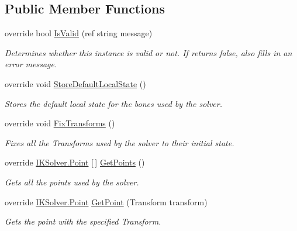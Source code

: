 \subsection*{Public Member Functions}
\begin{DoxyCompactItemize}
\item 
override bool \mbox{\hyperlink{class_root_motion_1_1_final_i_k_1_1_i_k_solver_f_a_b_r_i_k_root_aadae32713090c6aa827af13781f4a3da}{Is\+Valid}} (ref string message)
\begin{DoxyCompactList}\small\item\em Determines whether this instance is valid or not. If returns false, also fills in an error message. \end{DoxyCompactList}\item 
override void \mbox{\hyperlink{class_root_motion_1_1_final_i_k_1_1_i_k_solver_f_a_b_r_i_k_root_a6c378e881e1e7dcb7a2ce54ce39e0e88}{Store\+Default\+Local\+State}} ()
\begin{DoxyCompactList}\small\item\em Stores the default local state for the bones used by the solver. \end{DoxyCompactList}\item 
override void \mbox{\hyperlink{class_root_motion_1_1_final_i_k_1_1_i_k_solver_f_a_b_r_i_k_root_a174767501bc62dd1fb760e35a01a6ab0}{Fix\+Transforms}} ()
\begin{DoxyCompactList}\small\item\em Fixes all the Transforms used by the solver to their initial state. \end{DoxyCompactList}\item 
override \mbox{\hyperlink{class_root_motion_1_1_final_i_k_1_1_i_k_solver_1_1_point}{I\+K\+Solver.\+Point}} \mbox{[}$\,$\mbox{]} \mbox{\hyperlink{class_root_motion_1_1_final_i_k_1_1_i_k_solver_f_a_b_r_i_k_root_a386a3cb55b688ec13b8bb2299c0f2e75}{Get\+Points}} ()
\begin{DoxyCompactList}\small\item\em Gets all the points used by the solver. \end{DoxyCompactList}\item 
override \mbox{\hyperlink{class_root_motion_1_1_final_i_k_1_1_i_k_solver_1_1_point}{I\+K\+Solver.\+Point}} \mbox{\hyperlink{class_root_motion_1_1_final_i_k_1_1_i_k_solver_f_a_b_r_i_k_root_aee270791ec6890152459f80c211196f0}{Get\+Point}} (Transform transform)
\begin{DoxyCompactList}\small\item\em Gets the point with the specified Transform. \end{DoxyCompactList}\end{DoxyCompactItemize}
